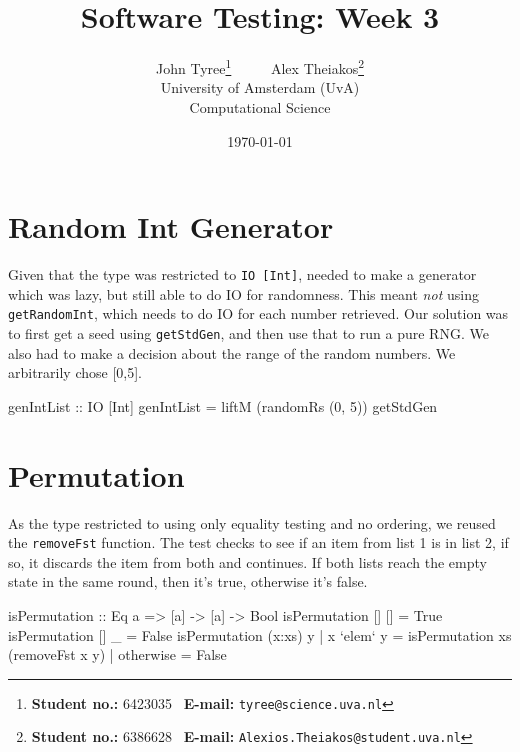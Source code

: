 \documentclass[a4paper,10pt]{article}
\title{Software Testing: Week 3}
\author{
John Tyree\footnote{\textbf{Student no.:} 6423035 \textbar\ \textbf{E-mail:} \texttt{tyree@science.uva.nl}} \ \ \ \ \ Alex Theiakos\footnote{\textbf{Student no.:}   6386628 \textbar\ \textbf{E-mail:} \texttt{Alexios.Theiakos@student.uva.nl}} \\[15pt] University of Amsterdam (UvA) \\ Computational Science}
\date{\today}
\numberwithin{equation}{section}%
\begin{document}
\maketitle

\setcounter{section}{1}
\section{Random Int Generator}

Given that the type was restricted to \texttt{IO [Int]}, needed to make a generator which was lazy, but still able to do IO for randomness. This meant \emph{not} using \texttt{getRandomInt}, which needs to do IO for each number retrieved. Our solution was to first get a seed using \texttt{getStdGen}, and then use that to run a pure RNG. We also had to make a decision about the range of the random numbers. We arbitrarily chose [0,5].

\begin{code}
genIntList :: IO [Int]
genIntList = liftM (randomRs (0, 5)) getStdGen
\end{code}


\section{Permutation}

As the type restricted to using only equality testing and no ordering, we reused the \texttt{removeFst} function. The test checks to see if an item from list 1 is in list 2, if so, it discards the item from both and continues. If both lists reach the empty state in the same round, then it's true, otherwise it's false.

\begin{code}
isPermutation :: Eq a => [a] -> [a] -> Bool
isPermutation [] [] = True
isPermutation [] _  = False
isPermutation (x:xs) y
    | x `elem` y = isPermutation xs (removeFst x y)
    | otherwise  = False
\end{code}
\end{document}
